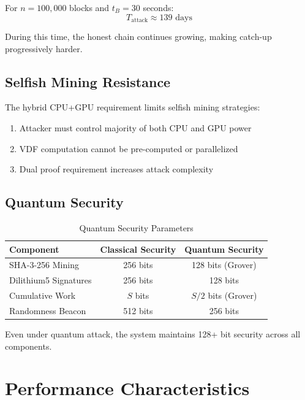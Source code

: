 \documentclass[11pt,a4paper]{article}
\begin{document}
For $n = 100,000$ blocks and $t_B = 30$ seconds:
\begin{equation}
    T_{\text{attack}} \approx 139 \text{ days}
\end{equation}

During this time, the honest chain continues growing, making catch-up progressively harder.

\subsection{Selfish Mining Resistance}

The hybrid CPU+GPU requirement limits selfish mining strategies:

\begin{enumerate}
    \item Attacker must control majority of both CPU and GPU power
    \item VDF computation cannot be pre-computed or parallelized
    \item Dual proof requirement increases attack complexity
\end{enumerate}

\subsection{Quantum Security}

\begin{table}[h]
\centering
\caption{Quantum Security Parameters}
\begin{tabular}{lcc}
\toprule
\textbf{Component} & \textbf{Classical Security} & \textbf{Quantum Security} \\
\midrule
SHA-3-256 Mining & 256 bits & 128 bits (Grover) \\
Dilithium5 Signatures & 256 bits & 128 bits \\
Cumulative Work & $S$ bits & $S/2$ bits (Grover) \\
Randomness Beacon & 512 bits & 256 bits \\
\bottomrule
\end{tabular}
\end{table}

Even under quantum attack, the system maintains 128+ bit security across all components.

\section{Performance Characteristics}
\end{document}
